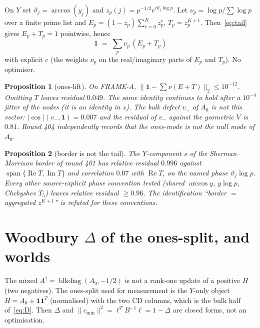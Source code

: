 \documentclass[11pt]{article}
\newtheorem{prop}{Proposition}
\theoremstyle{remark}
\begin{document}
On $Y$ set $\vartheta_j=\arccos(y_j)$ and
$z_p(j)=p^{-1/2}e^{i\vartheta_j\log p}$.
Let $\nu_p=\log p/\sum\log p$ over a finite prime list and
$E_p=(1-z_p)\sum_{r=0}^K z_p^r$, $T_p=z_p^{K+1}$.
Then~\eqref{eq:tail} gives $E_p+T_p=1$ pointwise, hence
\begin{equation}\label{eq:ones}
\mathbf{1}
\;=\;
\sum_p \nu_p\,(E_p+T_p)
\end{equation}
with explicit $c$ (the weights $\nu_p$ on the real/imaginary
parts of $E_p$ and $T_p$).  No optimiser.

\begin{prop}[ones-lift]\label{prop:ones}
On FRAME-A, $\|\mathbf{1}-\sum\nu(E+T)\|_2\le 10^{-12}$.
Omitting $T$ leaves residual $0.049$.
The same identity continues to hold after a $10^{-4}$ jitter
of the nodes (it is an identity in $z$).
The bulk defect $v_-$ of $A_0$ is not this vector:
$|\cos|(v_-,\mathbf{1})=0.007$ and the residual of $v_-$
against the geometric $V$ is $0.81$.
Round 404 independently records that the ones-mode is not
the null mode of $A_0$.
\end{prop}

\begin{prop}[border is not the tail]\label{prop:border}
The $Y$-component $s$ of the Sherman--Morrison border of
round 401 has relative residual $0.996$ against
$\operatorname{span}\{\operatorname{Re}T,\operatorname{Im}T\}$
and correlation $0.07$ with $\operatorname{Re}T$, on the
named phase $\vartheta_j\log p$.
Every other source-explicit phase convention tested (shared
$\arccos y$, $y\log p$, Chebyshev $T_5$) leaves relative
residual $\ge 0.96$.
The identification ``border $=$ aggregated $z^{K+1}$'' is
refuted for these conventions.
\end{prop}

\section{Woodbury $\Delta$ of the ones-split, and worlds}\label{sec:E2}

The mixed $A^\dagger=\operatorname{blkdiag}(A_0,-1/2)$ is not
a rank-one update of a positive $H$ (two negatives).
The ones-split used for measurement is the $Y$-only object
$H=A_0+\mathbf{1}\mathbf{1}^T$ (normalised) with the two CD
columns, which is the bulk half of~\eqref{eq:D}.
Then $\Delta$ and $\|c_{\min}\|^2=\ell^T B^{-1}\ell=1-\Delta$
are closed forms, not an optimisation.
\end{document}
